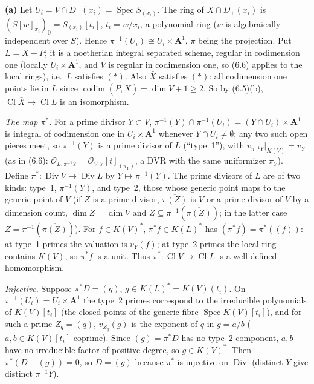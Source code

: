 \documentclass[11pt]{article}
\begin{document}
\textbf{(a)} Let $U_i=V\cap D_+(x_i)=\operatorname{Spec}S_{(x_i)}$. The ring of $\bar X\cap D_+(x_i)$ is $(S[w]_{x_i})_0=S_{(x_i)}[t_i]$, $t_i=w/x_i$, a polynomial ring ($w$ is algebraically independent over $S$). Hence $\pi^{-1}(U_i)\cong U_i\times\mathbf A^1$, $\pi$ being the projection. Put $L=\bar X-P$; it is a noetherian integral separated scheme, regular in codimension one (locally $U_i\times\mathbf A^1$, and $V$ is regular in codimension one, so (6.6) applies to the local rings), i.e.\ $L$ satisfies $(*)$. Also $\bar X$ satisfies $(*)$: all codimension one points lie in $L$ since $\operatorname{codim}(P,\bar X)=\dim V+1\ge2$. So by (6.5)(b), $\operatorname{Cl}\bar X\to\operatorname{Cl}L$ is an isomorphism.

\emph{The map $\pi^*$.} For a prime divisor $Y\subset V$, $\pi^{-1}(Y)\cap\pi^{-1}(U_i)=(Y\cap U_i)\times\mathbf A^1$ is integral of codimension one in $U_i\times\mathbf A^1$ whenever $Y\cap U_i\ne\emptyset$; any two such open pieces meet, so $\pi^{-1}(Y)$ is a prime divisor of $L$ (``type~1''), with $v_{\pi^{-1}Y}|_{K(V)}=v_Y$ (as in (6.6): $\mathcal O_{L,\pi^{-1}Y}=\mathcal O_{V,Y}[t]_{(\pi_Y)}$, a DVR with the same uniformizer $\pi_Y$). Define $\pi^*:\operatorname{Div}V\to\operatorname{Div}L$ by $Y\mapsto\pi^{-1}(Y)$. The prime divisors of $L$ are of two kinds: type~1, $\pi^{-1}(Y)$, and type~2, those whose generic point maps to the generic point of $V$ (if $Z$ is a prime divisor, $\overline{\pi(Z)}$ is $V$ or a prime divisor of $V$ by a dimension count, $\dim Z=\dim V$ and $Z\subseteq\pi^{-1}(\overline{\pi(Z)})$; in the latter case $Z=\pi^{-1}(\overline{\pi (Z)})$). For $f\in K(V)^*$, $\pi^*f\in K(L)^*$ has $(\pi^*f)=\pi^*((f))$: at type~1 primes the valuation is $v_Y(f)$; at type~2 primes the local ring contains $K(V)$, so $\pi^*f$ is a unit. Thus $\pi^*:\operatorname{Cl}V\to\operatorname{Cl}L$ is a well-defined homomorphism.

\emph{Injective.} Suppose $\pi^*D=(g)$, $g\in K(L)^*=K(V)(t_i)$. On $\pi^{-1}(U_i)=U_i\times\mathbf A^1$ the type~2 primes correspond to the irreducible polynomials of $K(V)[t_i]$ (the closed points of the generic fibre $\operatorname{Spec}K(V)[t_i]$), and for such a prime $Z_q=(q)$, $v_{Z_q}(g)$ is the exponent of $q$ in $g=a/b$ ($a,b\in K(V)[t_i]$ coprime). Since $(g)=\pi^*D$ has no type~2 component, $a,b$ have no irreducible factor of positive degree, so $g\in K(V)^*$. Then $\pi^*(D-(g))=0$, so $D=(g)$ because $\pi^*$ is injective on $\operatorname{Div}$ (distinct $Y$ give distinct $\pi^{-1}Y$).
\end{document}
